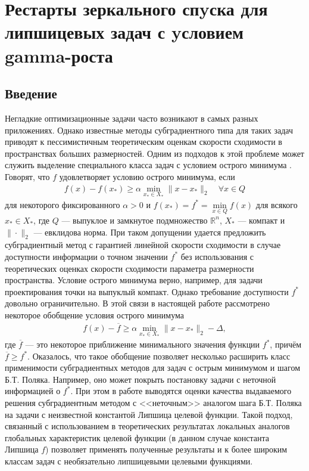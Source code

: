 \chapter{Рестарты зеркального спyска для липшицевых задач с yсловием gamma-роста}\label{ch:ch3}

\section{Введение}\label{sec:ch3/sect1}

    Негладкие оптимизационные задачи часто возникают в самых разных приложениях. Однако известные методы субградиентного типа для таких задач приводят к пессимистичным теоретическим оценкам скорости сходимости в пространствах больших размерностей. Одним из подходов к этой проблеме может служить выделение специального класса задач с условием острого минимума \cite{6, 1}. Говорят, что $f$ удовлетворяет условию острого минимума, если
    \begin{gather}\label{sm}
    f(x) - f(x_*) \geq \alpha \min_{x_* \in X_*} \|x- x_*\|_2 \quad \forall x \in Q
    \end{gather}
    для некоторого фиксированного $\alpha >0$ и $f(x_*) = f^* = \min\limits_{x\in Q} f(x)$ для всякого $x_* \in X_*$, где $Q$ --- выпуклое и замкнутое подмножество $\mathbb{R}^n$, $X_*$ --- компакт и $\|\cdot\|_2$ --- евклидова норма. 
    При таком допущении удается предложить субградиентный метод с гарантией  линейной скорости сходимости в случае доступности информации о точном значении $f^*$ \cite{6} без использования с теоретических оценках скорости сходимости  параметра размерности пространства. Условие острого минимума верно, например, для задачи проектирования точки на выпуклый компакт. Однако требование доступности $f^*$ довольно ограничительно. В этой связи в настоящей работе рассмотрено некоторое обобщение условия острого минимума
    \begin{gather}\label{eq_gen_sharp}
    f(x) - \overline{f} \geq \alpha \min_{x_* \in X_*} \|x - x_* \|_2 - \Delta,
    \end{gather}
    где $\overline{f}$  --- это некоторое приближение минимального значения функции $f^*$, причём $\overline{f} \geq f^*$. Оказалось, что такое обобщение позволяет несколько расширить класс применимости субградиентных методов для задач с острым минимумом и шагом Б.Т. Поляка. Например, оно может покрыть постановку задачи с неточной информацией о $f^*$. При этом в работе выводятся оценки качества выдаваемого решения субградиентным методом с <<неточным>> аналогом шага Б.Т. Поляка на задачи с неизвестной константой Липшица целевой функции. Такой подход, связанный с использованием в теоретических результатах локальных аналогов глобальных характеристик целевой функции (в данном случае константа Липшица $f$) позволяет применять полученные результаты и к более широким классам задач с необязательно липшицевыми целевыми функциями. 

